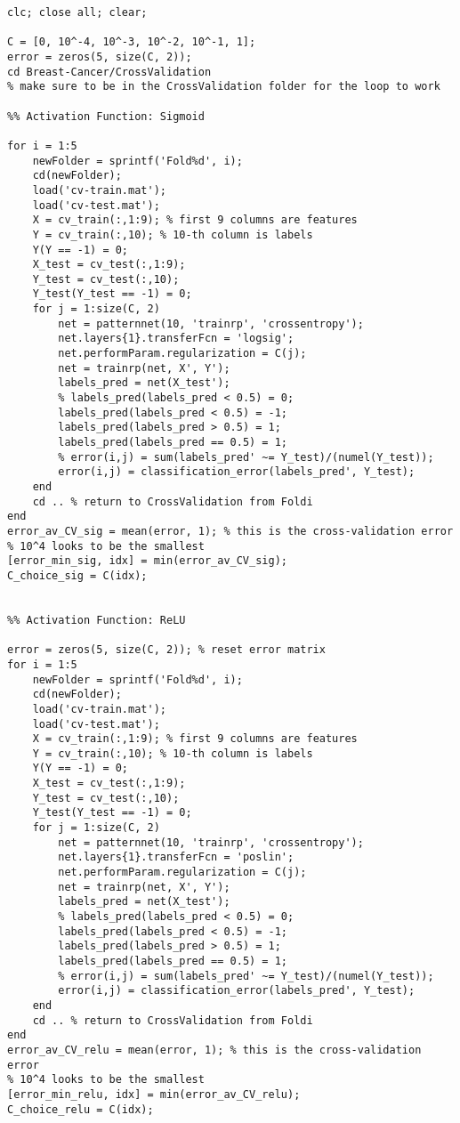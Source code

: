 \documentclass[english]{article}
\begin{document}
\begin{verbatim}
clc; close all; clear;

C = [0, 10^-4, 10^-3, 10^-2, 10^-1, 1];
error = zeros(5, size(C, 2));
cd Breast-Cancer/CrossValidation
% make sure to be in the CrossValidation folder for the loop to work

%% Activation Function: Sigmoid

for i = 1:5
    newFolder = sprintf('Fold%d', i);
    cd(newFolder);
    load('cv-train.mat');
    load('cv-test.mat');
    X = cv_train(:,1:9); % first 9 columns are features
    Y = cv_train(:,10); % 10-th column is labels
    Y(Y == -1) = 0;
    X_test = cv_test(:,1:9);
    Y_test = cv_test(:,10);
    Y_test(Y_test == -1) = 0;
    for j = 1:size(C, 2)
        net = patternnet(10, 'trainrp', 'crossentropy');
        net.layers{1}.transferFcn = 'logsig';
        net.performParam.regularization = C(j);
        net = trainrp(net, X', Y'); 
        labels_pred = net(X_test');
        % labels_pred(labels_pred < 0.5) = 0;
        labels_pred(labels_pred < 0.5) = -1;
        labels_pred(labels_pred > 0.5) = 1;
        labels_pred(labels_pred == 0.5) = 1;
        % error(i,j) = sum(labels_pred' ~= Y_test)/(numel(Y_test));
        error(i,j) = classification_error(labels_pred', Y_test);
    end
    cd .. % return to CrossValidation from Foldi
end
error_av_CV_sig = mean(error, 1); % this is the cross-validation error
% 10^4 looks to be the smallest
[error_min_sig, idx] = min(error_av_CV_sig);
C_choice_sig = C(idx);


%% Activation Function: ReLU

error = zeros(5, size(C, 2)); % reset error matrix
for i = 1:5
    newFolder = sprintf('Fold%d', i);
    cd(newFolder);
    load('cv-train.mat');
    load('cv-test.mat');
    X = cv_train(:,1:9); % first 9 columns are features
    Y = cv_train(:,10); % 10-th column is labels
    Y(Y == -1) = 0;
    X_test = cv_test(:,1:9);
    Y_test = cv_test(:,10);
    Y_test(Y_test == -1) = 0;
    for j = 1:size(C, 2)
        net = patternnet(10, 'trainrp', 'crossentropy');
        net.layers{1}.transferFcn = 'poslin';
        net.performParam.regularization = C(j);
        net = trainrp(net, X', Y'); 
        labels_pred = net(X_test');
        % labels_pred(labels_pred < 0.5) = 0;
        labels_pred(labels_pred < 0.5) = -1;
        labels_pred(labels_pred > 0.5) = 1;
        labels_pred(labels_pred == 0.5) = 1;
        % error(i,j) = sum(labels_pred' ~= Y_test)/(numel(Y_test));
        error(i,j) = classification_error(labels_pred', Y_test);
    end
    cd .. % return to CrossValidation from Foldi
end
error_av_CV_relu = mean(error, 1); % this is the cross-validation error
% 10^4 looks to be the smallest
[error_min_relu, idx] = min(error_av_CV_relu);
C_choice_relu = C(idx);


\end{verbatim}
\end{document}
